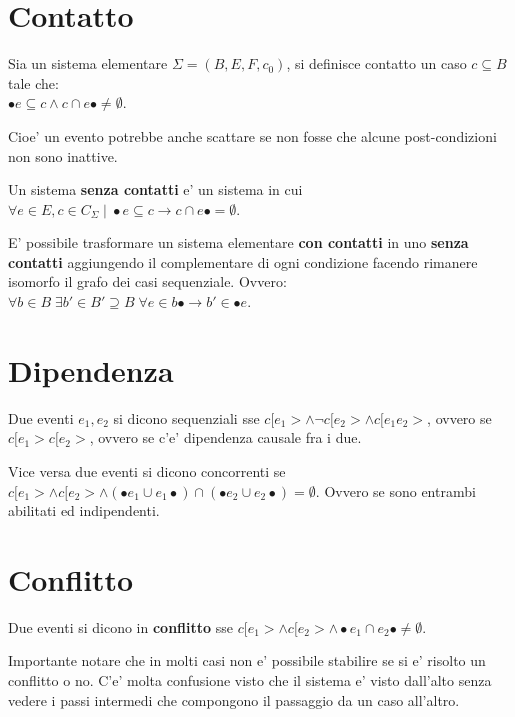 \section{Contatto}

Sia un sistema elementare $\Sigma = (B, E, F, c_0)$, si definisce contatto un caso $c \subseteq B$ tale che: \\
$\bullet e \subseteq c \land c \cap e \bullet \neq \emptyset$.

Cioe' un evento potrebbe anche scattare se non fosse che alcune post-condizioni non sono inattive.

Un sistema \textbf{senza contatti} e' un sistema in cui $\forall e \in E, c \in C_\Sigma \; | \; \bullet e \subseteq c \rightarrow c \cap e \bullet = \emptyset$.

E' possibile trasformare un sistema elementare \textbf{con contatti} in uno \textbf{senza contatti} aggiungendo il complementare di ogni condizione facendo rimanere isomorfo il grafo dei casi sequenziale.
Ovvero: $\forall b \in B\; \exists b' \in B' \supseteq B \; \forall e \in b \bullet \rightarrow b' \in \bullet e$.


\section{Dipendenza}

Due eventi $e_1,e_2$ si dicono sequenziali sse $c[e_1> \land \neg c[e_2> \land c[e_1e_2 >$, ovvero se $c[e_1 > c[e_2 >$, ovvero se c'e' dipendenza causale fra i due.

Vice versa due eventi si dicono concorrenti se $c[e_1> \land c[e_2> \land (\bullet e_1 \cup e_1 \bullet) \cap (\bullet e_2 \cup e_2 \bullet) = \emptyset$.
Ovvero se sono entrambi abilitati ed indipendenti.

\section{Conflitto}

Due eventi si dicono in \textbf{conflitto} sse $c[e_1> \land c[e_2> \land \bullet e_1 \cap e_2 \bullet \neq \emptyset$.

Importante notare che in molti casi non e' possibile stabilire se si e' risolto un conflitto o no. C'e' molta confusione visto che il sistema e' visto dall'alto senza vedere i passi intermedi che compongono il passaggio da un caso all'altro.

